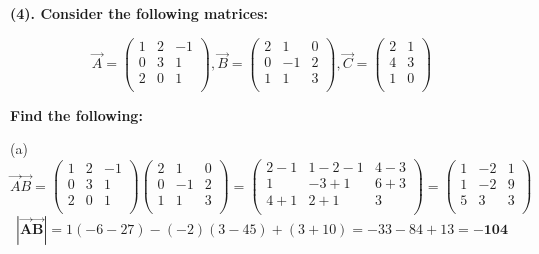 \documentclass[12pt]{article}
\begin{document}
\newpage
\textbf{(4). Consider the following matrices:}

$$
\vec{A} = 
\begin{pmatrix}
    1 & 2 & -1 \\
	0 & 3 & 1  \\
	2 & 0 & 1 \\
\end{pmatrix}
,
\vec{B} =
\begin{pmatrix}
    2 & 1 & 0 \\
	0 & -1 & 2\\
	1 & 1 & 3 \\
\end{pmatrix}
,
\vec{C} =
\begin{pmatrix}
    2 & 1 \\
	4 & 3 \\
	1 & 0\\
\end{pmatrix}
$$

\hfill \break

\textbf{Find the following:}

\hfill \break
(a)
$$
\vec{A}\vec{B} = 
\begin{pmatrix}
    1 & 2 & -1 \\
	0 & 3 & 1  \\
	2 & 0 & 1 \\
\end{pmatrix}
\begin{pmatrix}
    2 & 1 & 0 \\
	0 & -1 & 2\\
	1 & 1 & 3 \\
\end{pmatrix} =
\begin{pmatrix}
    2-1 & 1-2-1 & 4-3 \\
	1 & -3+1 & 6+3\\
	4+1 & 2+1 & 3 \\
\end{pmatrix} =
\begin{pmatrix}
    1 & -2 & 1 \\
	1 & -2 & 9\\
	5 & 3 & 3 \\
\end{pmatrix}
$$
$$
\mathbf{|\vec{A}\vec{B}|} = 1(-6-27)-(-2)(3-45) + (3+10) = -33 - 84 + 13 = \boldsymbol{-104}
$$
\end{document}

